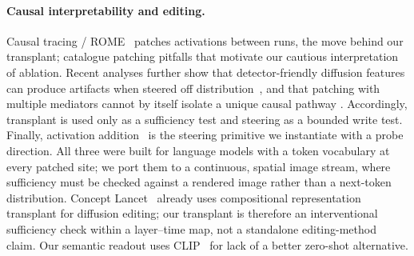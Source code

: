 \paragraph{Causal interpretability and editing.} Causal tracing / ROME~\citep{meng2022rome}
patches activations between runs, the move behind our transplant;
\citet{heimersheim2024activation} catalogue patching pitfalls that
motivate our cautious interpretation of ablation. Recent analyses further show
that detector-friendly diffusion features can produce artifacts when steered
off distribution~\citep{pegoraro2026look}, and that patching with multiple
mediators cannot by itself isolate a unique causal pathway
\citep{zhang2026curse}. Accordingly, transplant is used only as a sufficiency
test and steering as a bounded write test. Finally,
activation addition~\citep{turner2023actadd} is the steering primitive we
instantiate with a probe direction. All three were built for language
models with a token vocabulary at every patched site; we port them to a
continuous, spatial image stream, where sufficiency must be checked
against a rendered image rather than a next-token distribution. Concept
Lancet~\citep{luo2025colan} already uses compositional representation
transplant for diffusion editing; our transplant is therefore an
interventional sufficiency check within a layer--time map, not a standalone
editing-method claim. Our
semantic readout uses CLIP~\citep{radford2021clip} for lack of a better
zero-shot alternative.
